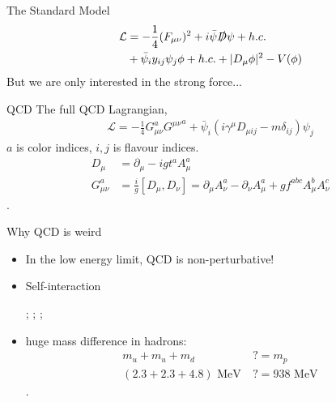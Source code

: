 \documentclass[10pt]{beamer}
\begin{document}
\begin{frame}{The Standard Model}
	\begin{align}
		\nonumber \mathcal{L} &= - \frac{1}{4}(F_{\mu\nu})^2 + i\bar{\psi}\slashed{D}\psi + h.c. \\
		\nonumber &+ \bar{\psi}_i y_{ij}\psi_j \phi + h.c. + |D_\mu\phi|^2 - V(\phi)
	\end{align}
	But we are only interested in the strong force...
\end{frame}

\begin{frame}{QCD}
	The full QCD Lagrangian,
	\begin{align}
		\nonumber \mathcal{L} = -\frac{1}{4} G_{\mu\nu}^a {G^{\mu\nu}}^a + \bar{\psi}_i (i\gamma^{\mu} D_{\mu ij} - m\delta_{ij})\psi_j
	\end{align}
	$a$ is color indices, $i,j$ is flavour indices. 
	\begin{align}
		\nonumber D_\mu &= \partial_\mu - i g t^a A_\mu^a\\
		\nonumber G_{\mu\nu}^a &= \frac{i}{g} [D_\mu,D_\nu] =  \partial_\mu A_\nu^a - \partial_\nu A_\mu^a + gf^{abc}A_\mu^b A_\nu^c
	\end{align}.
\end{frame}

\begin{frame}{Why QCD is weird}
	\begin{itemize}
		\item In the low energy limit, QCD is non-perturbative!
		\item Self-interaction

		\begin{center}
				;
				;
					;
			\end{center}
			
		\item huge mass difference in hadrons: 
		\begin{align}
			\nonumber m_u + m_u + m_d~ &?= m_p\\
			\nonumber  (	2.3 +  	2.3 + 4.8)\text{ MeV} ~&?= 938 \text{ MeV} 
		\end{align}.
	\end{itemize}
\end{frame}
\end{document}
